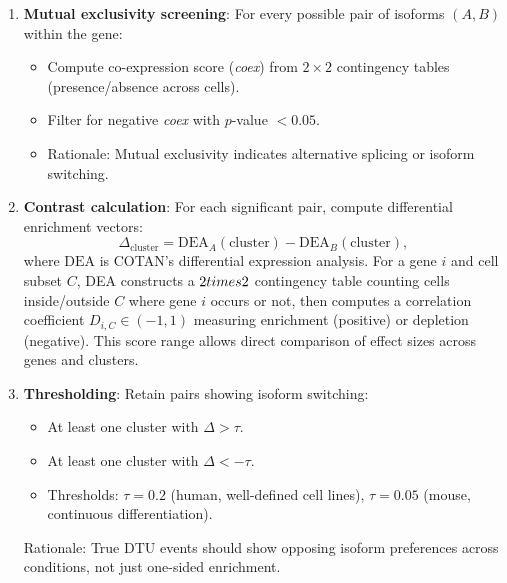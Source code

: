 \begin{enumerate}
    \item \textbf{Mutual exclusivity screening}: For every possible pair of isoforms $(A, B)$ within the gene:
    \begin{itemize}
        \item Compute co-expression score (\textit{coex}) from $2 \times 2$ contingency tables (presence/absence across cells).
        \item Filter for negative \textit{coex} with $p$-value $< 0.05$.
        \item Rationale: Mutual exclusivity indicates alternative splicing or isoform switching.
    \end{itemize}
    
    \item \textbf{Contrast calculation}: For each significant pair, compute differential enrichment vectors:
    \begin{equation}
        \Delta_{\text{cluster}} = \text{DEA}_A(\text{cluster}) - \text{DEA}_B(\text{cluster}),
    \end{equation}
    where $\text{DEA}$ is COTAN's differential expression analysis. For a gene $i$ and cell subset $C$, DEA constructs a $2 \\times 2$ contingency table counting cells inside/outside $C$ where gene $i$ occurs or not, then computes a correlation coefficient $D_{i,C} \in (-1, 1)$ measuring enrichment (positive) or depletion (negative). This score range allows direct comparison of effect sizes across genes and clusters.
    
    \item \textbf{Thresholding}: Retain pairs showing isoform switching:
    \begin{itemize}
        \item At least one cluster with $\Delta > \tau$.
        \item At least one cluster with $\Delta < -\tau$.
        \item Thresholds: $\tau = 0.2$ (human, well-defined cell lines), $\tau = 0.05$ (mouse, continuous differentiation).
    \end{itemize}
    Rationale: True DTU events should show opposing isoform preferences across conditions, not just one-sided enrichment.
\end{enumerate}

